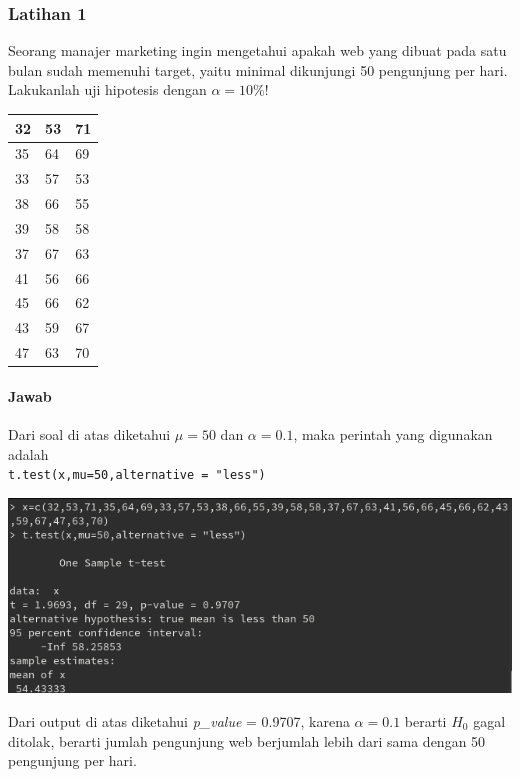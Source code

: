 \documentclass[a4paper,12pt]{article}
\begin{document}
\subsubsection{Latihan 1}
Seorang manajer marketing  ingin mengetahui apakah web yang dibuat pada satu bulan sudah memenuhi target, yaitu minimal dikunjungi 50 pengunjung per hari. Lakukanlah uji hipotesis dengan $\alpha = 10\%$! 
\begin{table}[!ht]
    \centering
    \begin{tabular}{|l|l|l|}
        \hline
        32 & 53 & 71 \\ \hline
        35 & 64 & 69 \\ \hline
        33 & 57 & 53 \\ \hline
        38 & 66 & 55 \\ \hline
        39 & 58 & 58 \\ \hline
        37 & 67 & 63 \\ \hline
        41 & 56 & 66 \\ \hline
        45 & 66 & 62 \\ \hline
        43 & 59 & 67 \\ \hline
        47 & 63 & 70 \\ \hline
    \end{tabular}
\end{table}
\paragraph{Jawab\\}
Dari soal di atas diketahui $\mu = 50$ dan $\alpha = 0.1$, maka  perintah yang digunakan adalah\\
\texttt{t.test(x,mu=50,alternative = "less")}\\
\begin{center}
    \includegraphics[width=0.8\linewidth]{lat1.png}
\end{center}
Dari output di atas diketahui \textit{p\_value} = 0.9707, karena $\alpha = 0.1$ berarti $H_{0}$ gagal ditolak, berarti jumlah pengunjung web berjumlah lebih dari sama dengan 50 pengunjung per hari.
\end{document}
